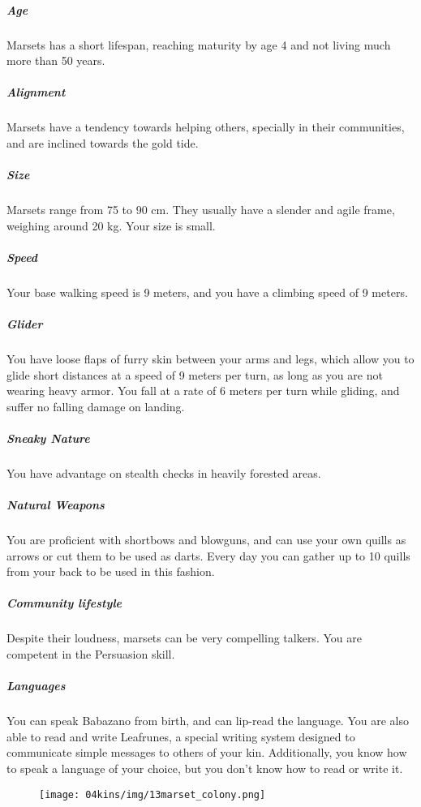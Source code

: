     \subparagraph{Age} Marsets has a short lifespan, reaching maturity by age 4 and not living much more than 50 years.

    \subparagraph{Alignment} Marsets have a tendency towards helping others, specially in their communities, and are inclined towards the gold tide.

    \subparagraph{Size} Marsets range from 75 to 90 cm.
    They usually have a slender and agile frame, weighing around 20 kg.
    Your size is small.

    \subparagraph{Speed} Your base walking speed is 9 meters, and you have a climbing speed of 9 meters.

    \subparagraph{Glider} You have loose flaps of furry skin between your arms and legs, which allow you to glide short distances at a speed of 9 meters per turn, as long as you are not wearing heavy armor.
    You fall at a rate of 6 meters per turn while gliding, and suffer no falling damage on landing.

    \subparagraph{Sneaky Nature} You have advantage on stealth checks in heavily forested areas.

    \subparagraph{Natural Weapons} You are proficient with shortbows and blowguns, and can use your own quills as arrows or cut them to be used as darts.
    Every day you can gather up to 10 quills from your back to be used in this fashion.

    \subparagraph{Community lifestyle} Despite their loudness, marsets can be very compelling talkers.
    You are competent in the Persuasion skill.

    \subparagraph{Languages} You can speak Babazano from birth, and can lip-read the language.
    You are also able to read and write Leafrunes, a special writing system designed to communicate simple messages to others of your kin.
    Additionally, you know how to speak a language of your choice, but you don't know how to read or write it.

\begin{figure}[!b]
    \centering
    \texttt{[image: 04kins/img/13marset\_colony.png]}
\end{figure}

\newpage
